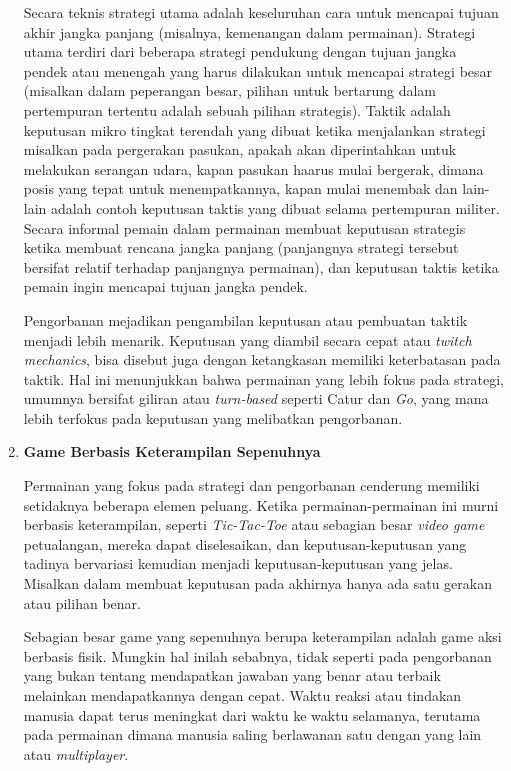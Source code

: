 \begin{enumerate}[label=\textbf{\alph*).}]
	Secara teknis strategi utama adalah keseluruhan cara untuk mencapai tujuan akhir jangka panjang (misalnya, kemenangan dalam permainan). Strategi utama terdiri dari beberapa strategi pendukung dengan tujuan jangka pendek atau menengah yang harus dilakukan untuk mencapai strategi besar (misalkan dalam peperangan besar, pilihan untuk bertarung dalam pertempuran tertentu adalah sebuah pilihan strategis). Taktik adalah keputusan mikro tingkat terendah yang dibuat ketika menjalankan strategi misalkan pada pergerakan pasukan, apakah akan diperintahkan untuk melakukan serangan udara, kapan pasukan haarus mulai bergerak, dimana posis yang tepat untuk menempatkannya, kapan mulai menembak dan lain-lain adalah contoh keputusan taktis yang dibuat selama pertempuran militer. Secara informal pemain dalam permainan membuat keputusan strategis ketika membuat rencana jangka panjang (panjangnya strategi tersebut bersifat relatif terhadap panjangnya permainan), dan keputusan taktis ketika pemain ingin mencapai tujuan jangka pendek.
	\vspace{1ex}
	
	Pengorbanan mejadikan pengambilan keputusan atau pembuatan taktik menjadi lebih menarik. Keputusan yang diambil secara cepat atau \textit{twitch mechanics}, bisa disebut juga dengan ketangkasan memiliki keterbatasan pada taktik. Hal ini menunjukkan bahwa permainan yang lebih fokus pada strategi, umumnya bersifat giliran atau \textit{turn-based} seperti Catur dan \textit{Go}, yang mana lebih terfokus pada keputusan yang melibatkan pengorbanan.
	\vspace{1ex}
	
	\item \textbf{Game Berbasis Keterampilan Sepenuhnya}
	
	Permainan yang fokus pada strategi dan pengorbanan cenderung memiliki setidaknya beberapa elemen peluang. Ketika permainan-permainan ini murni berbasis keterampilan, seperti \textit{Tic-Tac-Toe} atau sebagian besar \textit{video game} petualangan, mereka dapat diselesaikan, dan keputusan-keputusan yang tadinya bervariasi kemudian menjadi keputusan-keputusan yang jelas. Misalkan dalam membuat keputusan pada akhirnya hanya ada satu gerakan atau pilihan benar.
	\vspace{1ex}
	
	Sebagian besar game yang sepenuhnya berupa keterampilan adalah game aksi berbasis fisik. Mungkin hal inilah sebabnya, tidak seperti pada pengorbanan yang bukan tentang mendapatkan jawaban yang benar atau terbaik melainkan mendapatkannya dengan cepat. Waktu reaksi atau tindakan manusia dapat terus meningkat dari waktu ke waktu selamanya, terutama pada permainan dimana manusia saling berlawanan satu dengan yang lain atau \textit{multiplayer}.
	\vspace{1ex}
\end{enumerate}

